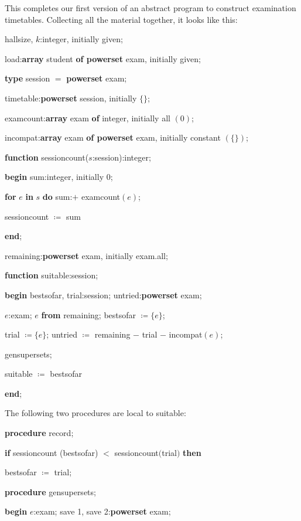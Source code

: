 This completes our first version of an abstract program to construct examination timetables. Collecting all the material together, it looks like this:

hallsize, $k$:integer, initially given;

load:\textbf{array} student \textbf{of powerset} exam, initially given;

\textbf{type} session $=$ \textbf{powerset} exam;

timetable:\textbf{powerset} session, initially $\{\}$;

examcount:\textbf{array} exam \textbf{of} integer, initially all $(0)$;

incompat:\textbf{array} exam \textbf{of powerset} exam, initially constant $(\{\})$;

\textbf{function} sessioncount($s$:session):integer;

\quad \textbf{begin} sum:integer, initially 0;

\quad \quad \textbf{for} $e$ \textbf{in} $s$ \textbf{do} sum:$+$ examcount$(e)$;

\quad \quad sessioncount $\coloneq$ sum

\quad \textbf{end};

\quad remaining:\textbf{powerset} exam, initially exam.all;

\textbf{function} suitable:session;

\quad \textbf{begin} bestsofar, trial:session; untried:\textbf{powerset} exam;

\quad \quad $e$:exam; $e$ \textbf{from} remaining; bestsofar $\coloneq \{e\}$;

\quad \quad trial $\coloneq \{e\}$; untried $\coloneq$ remaining $-$ trial $-$ incompat$(e)$;

\quad \quad gensupersets;

\quad \quad suitable $\coloneq$ bestsofar

\quad \textbf{end};

\noindent
The following two procedures are local to suitable:

\quad \textbf{procedure} record;

\quad \quad \textbf{if} sessioncount (bestsofar) $<$ sessioncount$($trial$)$ \textbf{then} 

\quad \quad \quad bestsofar $\coloneq$ trial;

\quad \textbf{procedure} gensupersets;

\quad \quad \textbf{begin} $e$:exam; save 1, save 2:\textbf{powerset} exam;

